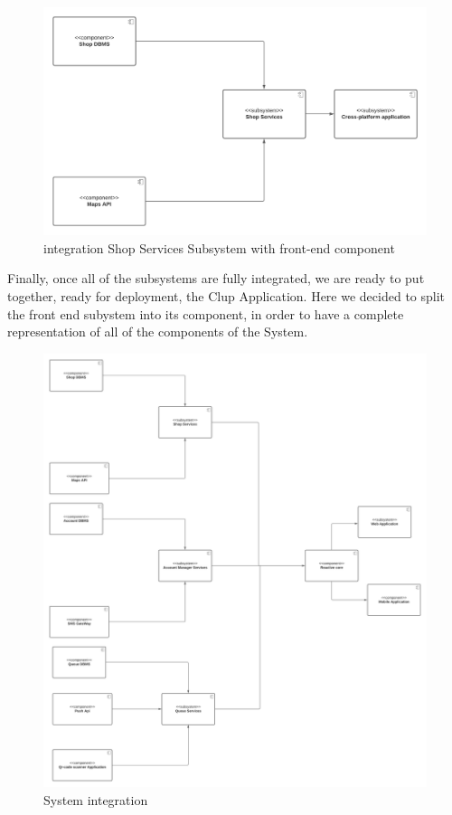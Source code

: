 \begin{figure}[h!]
    \centering
    \includegraphics[width=1\textwidth]{Images/TestDiagram/viewShop.png}
    \caption{\label{fig:viewAccount}{integration Shop Services Subsystem with front-end component}}
\end{figure}
\FloatBarrier 


Finally, once all of the subsystems are fully integrated, we are ready to put together, ready for deployment, the Clup Application. Here we decided to split the front end subystem into its component, in order to have a complete representation of all of the components of the System.

\begin{figure}[h!]
    \centering
    \includegraphics[width=1\textwidth]{Images/TestDiagram/whole application.png}
    \caption{\label{fig:wholeapp}{System integration}}
\end{figure}
\FloatBarrier 

